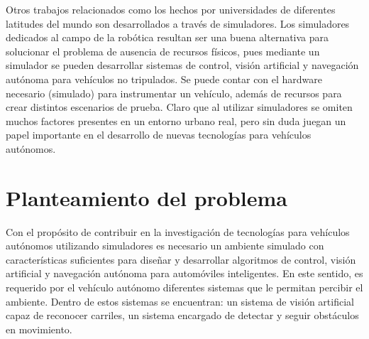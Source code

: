 Otros trabajos relacionados como los hechos por universidades de diferentes latitudes del mundo son desarrollados a través de simuladores. Los simuladores dedicados al campo de la robótica resultan ser una buena alternativa para solucionar el problema de ausencia de recursos físicos, pues mediante un simulador se pueden desarrollar sistemas de control, visión artificial y navegación autónoma para vehículos no tripulados. Se puede contar con el hardware necesario (simulado) para instrumentar un vehículo, además de recursos para crear distintos escenarios de prueba. Claro que al utilizar simuladores se omiten muchos factores presentes en un entorno urbano real, pero sin duda juegan un papel importante en el desarrollo de nuevas tecnologías para vehículos autónomos.


\section{Planteamiento del problema}

Con el propósito de contribuir en la investigación de tecnologías para vehículos autónomos utilizando simuladores es necesario un ambiente simulado con características suficientes para diseñar y desarrollar algoritmos de control, visión artificial y navegación autónoma para automóviles inteligentes. En este sentido, es requerido por el vehículo autónomo diferentes sistemas que le permitan percibir el ambiente. Dentro de estos sistemas se encuentran: un sistema de visión artificial capaz de reconocer carriles, un sistema encargado de detectar y seguir obstáculos en movimiento. 

